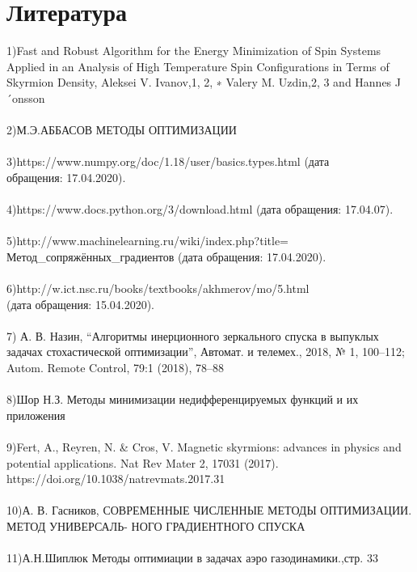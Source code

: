 \documentclass[ 12pt,x11names]{article}
\begin{document}
\section{Литература}
1)Fast and Robust Algorithm for the Energy Minimization of Spin Systems Applied in
an Analysis of High Temperature Spin Configurations in Terms of Skyrmion Density, Aleksei V. Ivanov,1, 2, ∗ Valery M. Uzdin,2, 3 and Hannes J´onsson\\
\\
2)М.Э.АББАСОВ
МЕТОДЫ ОПТИМИЗАЦИИ\\
\\
3)https://www.numpy.org/doc/1.18/user/basics.types.html (дата\\ обращения: 17.04.2020).\\
\\
4)https://www.docs.python.org/3/download.html (дата обращения: 17.04.07).\\
\\
5)http://www.machinelearning.ru/wiki/index.php?title=\\
Метод\_сопряжённых\_градиентов (дата обращения: 17.04.2020).\\
\\
6)http://w.ict.nsc.ru/books/textbooks/akhmerov/mo/5.html\\
(дата обращения: 15.04.2020).\\
\\
7)  А. В. Назин, “Алгоритмы инерционного зеркального спуска в выпуклых задачах стохастической оптимизации”, Автомат. и телемех., 2018, № 1, 100–112; Autom. Remote Control, 79:1 (2018), 78–88\\
\\
8)Шор Н.З. Методы минимизации недифференцируемых функций и их приложения\\
\\
9)Fert, A., Reyren, N. & Cros, V. Magnetic skyrmions: advances in physics and potential applications. Nat Rev Mater 2, 17031 (2017).\\ https://doi.org/10.1038/natrevmats.2017.31\\
\\
10)А. В. Гасников, СОВРЕМЕННЫЕ ЧИСЛЕННЫЕ МЕТОДЫ ОПТИМИЗАЦИИ. МЕТОД УНИВЕРСАЛЬ-
НОГО ГРАДИЕНТНОГО СПУСКА\\
\\
11)А.Н.Шиплюк Методы оптимиации в задачах аэро газодинамики.,стр. 33
\end{document}
